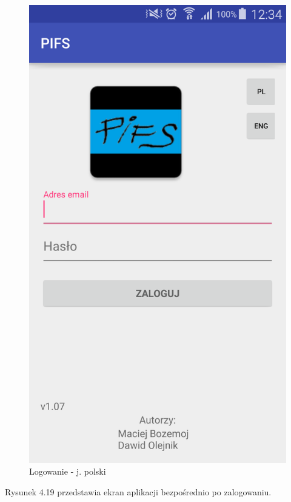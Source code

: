 \documentclass[a4paper,11pt]{article}
\begin{document}
\begin{figure}[h!]
	\centering
	\includegraphics[width=\textwidth,height=0.6\textheight]{startPolski.png}
	\caption{Logowanie - j. polski}
\end{figure}

Rysunek 4.19 przedstawia ekran aplikacji bezpośrednio po zalogowaniu.
\end{document}
